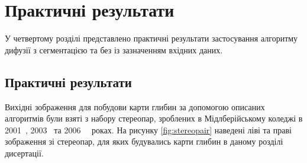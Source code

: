\chapter{Практичні результати}

У четвертому розділі представлено практичні результати
застосування алгоритму дифузії з сегментацією
та без із зазначенням вхідних даних.

\section{Практичні результати}

Вихідні зображення для побудови карти глибин
за допомогою описаних алгоритмів були взяті з набору стереопар,
зроблених в Мідлберійському коледжі в 2001~\cite{middlebury:ds:2001},
2003~\cite{middlebury:ds:2003}
та 2006~\cite{middlebury:ds:2006:1}~\cite{middlebury:ds:2006:2} роках.
На рисунку \ref{fig:stereopair} наведені ліві та праві зображення зі стереопар,
для яких будувались карти глибин в даному розділі дисертації.

